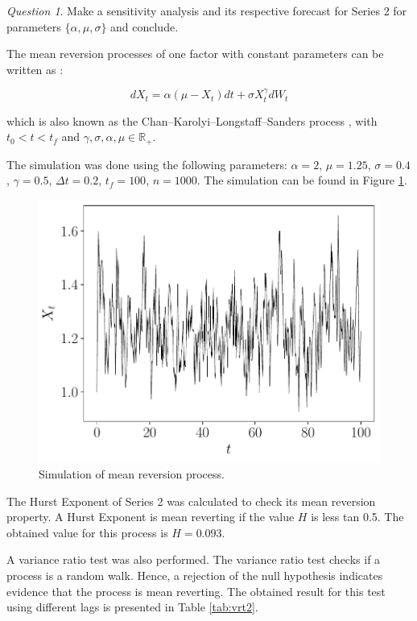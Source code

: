 \documentclass[11pt]{article}
\theoremstyle{definition}
\theoremstyle{remark}
\theoremstyle{remark}
\newtheorem{question}{Question}
\newcommand{\R}{{\mathbb{R}}}
\begin{document}
\begin{question}
  Make a sensitivity analysis and its respective forecast for Series 2
  for parameters $\{\alpha, \mu, \sigma\}$ and conclude.
\end{question}

The mean reversion processes of one factor with constant parameters
can be written as \parencite{marin2013}:

\begin{equation*}
  dX_t = \alpha (\mu - X_t) dt + \sigma X_t^\gamma dW_t
\end{equation*}

which is also known as the Chan–Karolyi–Longstaff–Sanders process
\parencite{chan1992}, with $t_0 < t < t_f$ and
$\gamma, \sigma, \alpha, \mu \in \R_+$.

The simulation was done using the following parameters: $\alpha = 2$,
$\mu = 1.25$, $\sigma = 0.4$, $\gamma = 0.5$, $\Delta t = 0.2$,
$t_f = 100$, $n = 1000$. The simulation can be found in Figure
\ref{fig:series2}.

\begin{figure}
  \centering
  \includegraphics[scale=.5]{ornstein_serie2.pdf}
  \caption{Simulation of mean reversion process.}
  \label{fig:series2}
\end{figure}

The Hurst Exponent of Series 2 was calculated to check its mean
reversion property. A Hurst Exponent is mean reverting if the value
$H$ is less tan 0.5. The obtained value for this process is
$H = 0.093$.

A variance ratio test was also performed. The variance ratio test
checks if a process is a random walk. Hence, a rejection of the null
hypothesis indicates evidence that the process is mean reverting. The
obtained result for this test using different lags is presented in
Table \ref{tab:vrt2}.
\end{document}
